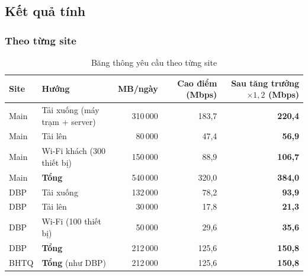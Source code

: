\subsection{Kết quả tính}

\subsubsection{Theo từng site}
\begin{small}
\begin{longtable}{|l|l|r|r|r|}
\caption{Băng thông yêu cầu theo từng site} \label{tab:bw_sites} \\
\hline
\textbf{Site} & \textbf{Hướng} & \textbf{MB/ngày} & \textbf{Cao điểm (Mbps)} & \textbf{Sau tăng trưởng $\times1{,}2$ (Mbps)} \\ \hline
\endhead
Main & Tải xuống (máy trạm + server) & 310\,000 & 183,7 & \textbf{220,4} \\ \hline
Main & Tải lên & 80\,000 & 47,4 & \textbf{56,9} \\ \hline
Main & Wi-Fi khách (300 thiết bị) & 150\,000 & 88,9 & \textbf{106,7} \\ \hline
Main & \textbf{Tổng} & 540\,000 & 320,0 & \textbf{384,0} \\ \hline
DBP & Tải xuống & 132\,000 & 78,2 & \textbf{93,9} \\ \hline
DBP & Tải lên & 30\,000 & 17,8 & \textbf{21,3} \\ \hline
DBP & Wi-Fi (100 thiết bị) & 50\,000 & 29,6 & \textbf{35,6} \\ \hline
DBP & \textbf{Tổng} & 212\,000 & 125,6 & \textbf{150,8} \\ \hline
BHTQ & \textbf{Tổng} (như DBP) & 212\,000 & 125,6 & \textbf{150,8} \\ \hline
\end{longtable}
\end{small}

